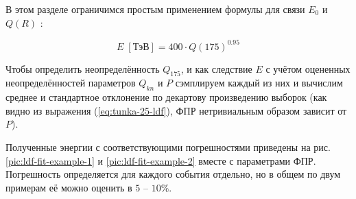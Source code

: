 В этом разделе ограничимся простым применением формулы для связи $E_0$ и $Q(R)$ \cite{Budnev2005}:

\begin{equation}
	\label{eq:E0-from-Q175}
	E \; [\text{ТэВ}] = 400 \cdot Q(175)^{0.95}
\end{equation}

Чтобы определить неопределённость $Q_{175}$, и как следствие $E$ с учётом оцененных неопределённостей параметров $Q_{kn}$ и $P$ сэмплируем каждый из них и вычислим среднее и стандартное отклонение по декартову произведению выборок (как видно из выражения (\ref{eq:tunka-25-ldf}), ФПР нетривиальным образом зависит от $P$).

Полученные энергии с соответствующими погрешностями приведены на рис. \ref{pic:ldf-fit-example-1} и \ref{pic:ldf-fit-example-2} вместе с параметрами ФПР. Погрешность определяется для каждого события отдельно, но в общем по двум примерам её можно оценить в $5$ -- $10 \%$.

